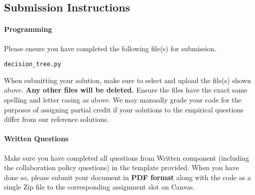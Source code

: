 \subsection{Submission Instructions}

\paragraph{Programming}
Please ensure you have completed the following file(s) for submission.

\begin{verbatim}
decision_tree.py
\end{verbatim}

When submitting your solution, make sure to select and upload the file(s) shown above. \textbf{Any other files will be deleted.} Ensure the files have the exact same spelling and letter casing as above. We may manually grade your code for the purposes of assigning partial credit if your solutions to the empirical questions differ from our reference solutions. 

\paragraph{Written Questions}
Make sure you have completed all questions from Written component (including the collaboration policy questions) in the template provided.  When you have done so, please submit your document in \textbf{PDF format} along with the code as a single Zip file to the corresponding assignment slot on Canvas.

